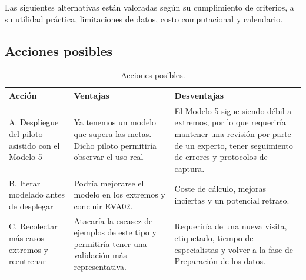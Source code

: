 Las siguientes alternativas están valoradas según su cumplimiento de criterios, a su utilidad práctica, limitaciones de datos, costo computacional y calendario.

\subsection{Acciones posibles}

\begin{table}[H]
  \centering
  \small
  \caption{Acciones posibles.}
  \label{tab:acciones}
  \begin{tabularx}{\textwidth}{>{\raggedright\arraybackslash}p{}>{\raggedright\arraybackslash}X>{\raggedright\arraybackslash}X}
    \toprule
    Acción & Ventajas & Desventajas \\
    \midrule
    A. Despliegue del piloto asistido con el Modelo 5 & Ya tenemos un modelo que supera las metas. Dicho piloto permitiría observar el uso real & El Modelo 5 sigue siendo débil a extremos, por lo que requeriría mantener una revisión por parte de un experto, tener seguimiento de errores y protocolos de captura. \\
    \addlinespace
    B. Iterar modelado antes de desplegar & Podría mejorarse el modelo en los extremos y concluir EVA02. & Coste de cálculo, mejoras inciertas y un potencial retraso. \\
    \addlinespace
    C. Recolectar más casos extremos y reentrenar & Atacaría la escasez de ejemplos de este tipo y permitiría tener una validación más representativa. & Requeriría de una nueva visita, etiquetado, tiempo de especialistas y volver a la fase de Preparación de los datos. \\
    \bottomrule
  \end{tabularx}
\end{table}
